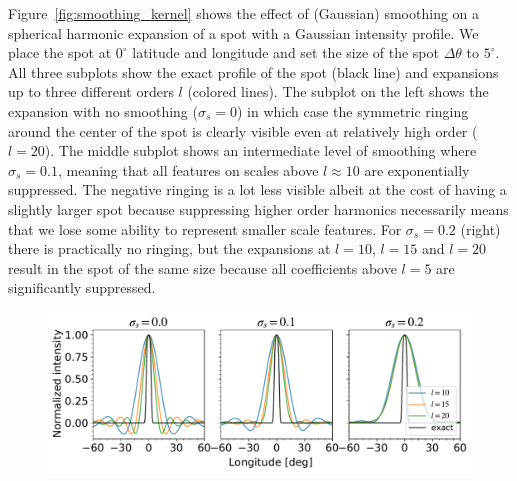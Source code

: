 \documentclass[modern]{aastex62}
\begin{document}
Figure~\ref{fig:smoothing_kernel} shows the effect of (Gaussian) smoothing on a spherical harmonic expansion of a spot with a Gaussian intensity profile.
We place the spot at $0^\circ$ latitude and longitude and set the size of the spot $\Delta\theta$ to $5^\circ$.
All three subplots show the exact profile of the spot (black line) and expansions up to three different orders $l$ (colored lines).
The subplot on the left shows the expansion with no smoothing ($\sigma_s=0$) in which case the symmetric ringing around the center of the spot is clearly visible even at relatively high order ($l=20$).
The middle subplot shows an intermediate level of smoothing where $\sigma_s=0.1$, meaning that all features on scales above $l\approx 10$ are exponentially suppressed.
The negative ringing is a lot less visible albeit at the cost of having a slightly larger spot because suppressing higher order harmonics necessarily means that we lose some ability to represent smaller scale features.
For $\sigma_s=0.2$ (right) there is practically no ringing, but the expansions at $l=10$, $l=15$ and $l=20$ result in the spot of the same size because all coefficients above $l=5$ are significantly suppressed.

\begin{figure}[h!]
    \begin{centering}
    \includegraphics[width=1.\linewidth]{figures/smoothing_kernel.pdf}
    \end{centering}
\end{figure}
\end{document}
